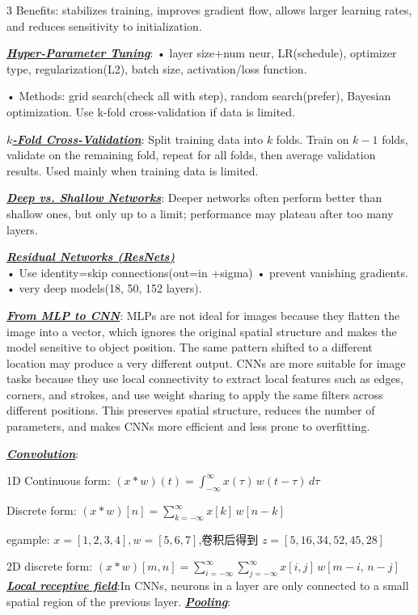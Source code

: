 \documentclass[12pt]{article}
\newcommand{\bulletPoint}[1]{\underline{\textit{\textbf{#1}}}}
\begin{document}
\begin{multicols*}{3}
Benefits: stabilizes training, improves gradient flow, allows larger learning rates, and reduces sensitivity to initialization.

\bulletPoint{Hyper-Parameter Tuning}:
• layer size+num neur, LR(schedule), optimizer type, regularization(L2), batch size, activation/loss function. \quad

• Methods: grid search(check all with step), random search(prefer), Bayesian optimization. Use k-fold cross-validation if data is limited.


\bulletPoint{$k$-Fold Cross-Validation}:
Split training data into $k$ folds.
Train on $k-1$ folds, validate on the remaining fold, repeat for all folds, then average validation results.
Used mainly when training data is limited.

\bulletPoint{Deep vs. Shallow Networks}:
Deeper networks often perform better than shallow ones, but only up to a limit; performance may plateau after too many layers.

\bulletPoint{Residual Networks (ResNets)} \\
• Use identity=skip connections(out=in +sigma)\quad
• prevent vanishing gradients. \quad
• very deep models(18, 50, 152 layers).

\bulletPoint{From MLP to CNN}:
MLPs are not ideal for images because they flatten the image into a vector, which ignores the original spatial structure and makes the model sensitive to object position. The same pattern shifted to a different location may produce a very different output. CNNs are more suitable for image tasks because they use local connectivity to extract local features such as edges, corners, and strokes, and use weight sharing to apply the same filters across different positions. This preserves spatial structure, reduces the number of parameters, and makes CNNs more efficient and less prone to overfitting.

\bulletPoint{Convolution}:

1D Continuous form: $\displaystyle(x * w)(t) = \int_{-\infty}^{\infty} x(\tau)\, w(t-\tau)\, d\tau$

Discrete form: $\displaystyle(x * w)[n] = \sum_{k=-\infty}^{\infty} x[k]\, w[n-k]$

egample: $x=[1,2,3,4], w=[5,6,7]$,卷积后得到 $z=[5,16,34,52,45,28]$

2D discrete form: $(x * w)[m,n] = \sum_{i=-\infty}^{\infty} \sum_{j=-\infty}^{\infty} x[i,j]\, w[m-i,\, n-j]$
\bulletPoint{Local receptive field}:In CNNs, neurons in a layer are only connected to a small spatial region
of the previous layer.
\bulletPoint{Pooling}:


\end{multicols*}
\end{document}
